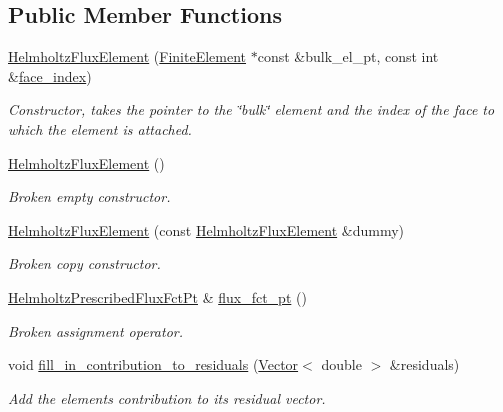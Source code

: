 \subsection*{Public Member Functions}
\begin{DoxyCompactItemize}
\item 
\hyperlink{classoomph_1_1HelmholtzFluxElement_a8c9a62afbb6ed06a0441d4fbf607624c}{Helmholtz\+Flux\+Element} (\hyperlink{classoomph_1_1FiniteElement}{Finite\+Element} $\ast$const \&bulk\+\_\+el\+\_\+pt, const int \&\hyperlink{classoomph_1_1FaceElement_a478d577ac6db67ecc80f1f02ae3ab170}{face\+\_\+index})
\begin{DoxyCompactList}\small\item\em Constructor, takes the pointer to the \char`\"{}bulk\char`\"{} element and the index of the face to which the element is attached. \end{DoxyCompactList}\item 
\hyperlink{classoomph_1_1HelmholtzFluxElement_a73182cbef5c3c2ccb7abdb6337b3651b}{Helmholtz\+Flux\+Element} ()
\begin{DoxyCompactList}\small\item\em Broken empty constructor. \end{DoxyCompactList}\item 
\hyperlink{classoomph_1_1HelmholtzFluxElement_a6a2ee949191b2634cd3d5cd305f1982b}{Helmholtz\+Flux\+Element} (const \hyperlink{classoomph_1_1HelmholtzFluxElement}{Helmholtz\+Flux\+Element} \&dummy)
\begin{DoxyCompactList}\small\item\em Broken copy constructor. \end{DoxyCompactList}\item 
\hyperlink{classoomph_1_1HelmholtzFluxElement_ad53ce405c551a39ac9baeaaab7f254df}{Helmholtz\+Prescribed\+Flux\+Fct\+Pt} \& \hyperlink{classoomph_1_1HelmholtzFluxElement_ac2f6581b3619489d41822761038f4bf5}{flux\+\_\+fct\+\_\+pt} ()
\begin{DoxyCompactList}\small\item\em Broken assignment operator. \end{DoxyCompactList}\item 
void \hyperlink{classoomph_1_1HelmholtzFluxElement_a861a3825432d2ddc1b0e2deff79ed0bc}{fill\+\_\+in\+\_\+contribution\+\_\+to\+\_\+residuals} (\hyperlink{classoomph_1_1Vector}{Vector}$<$ double $>$ \&residuals)
\begin{DoxyCompactList}\small\item\em Add the element\textquotesingle{}s contribution to its residual vector. \end{DoxyCompactList}\item 

\end{DoxyCompactItemize}
